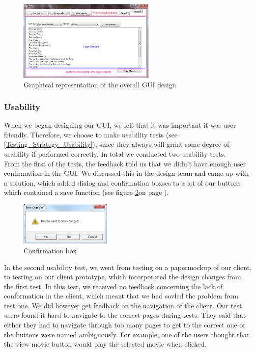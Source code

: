\begin{figure}[h!]
  \centering
\includegraphics[width=0.60\textwidth]{Parts/Images/Design/GUIDesign}
\caption{Graphical representation of the overall GUI design}
\label{fig:Design_Client_GUI_Usability_design}
\end{figure}


\subsubsection{Usability}
\label{Design_Client_GUI_Usability}
When we began designing our GUI, we felt that it was important it was user friendly. Therefore, we choose to make usability tests (see \ref{Testing_Strategy_Usability}), since they always will grant some degree of usability if performed correctly. In total we conducted two usability tests.
\\From the first of the tests, the feedback told us that we didn't have enough user confirmation in the GUI. We discussed this in the design team and came up with a solution, which added dialog and confirmation boxses to a lot of our buttons which contained a save function (see figure \ref{fig:Design_Client_GUI_Usability_popup}on page \pageref{fig:Design_Client_GUI_Usability_popup}).

\begin{figure}[h!]
  \centering
\includegraphics[width=0.4\textwidth]{Parts/Images/Design/Confirmationbox}
\caption{Confirmation box}
\label{fig:Design_Client_GUI_Usability_popup}
\end{figure}

In the second usability test, we went from testing on a papermockup of our client, to testing on our client prototype, which incorporated the design changes from the first test. In this test, we received no feedback concerning the lack of conformation in the client, which meant that we had sovled the problem from test one. We did however get feedback on the navigation of the client. Our test users found it hard to navigate to the correct pages during tests. They said that either they had to navigate through too many pages to get to the correct one or the buttons were named ambiguously. For example, one of the users thought that the view movie button would play the selected movie when clicked.

